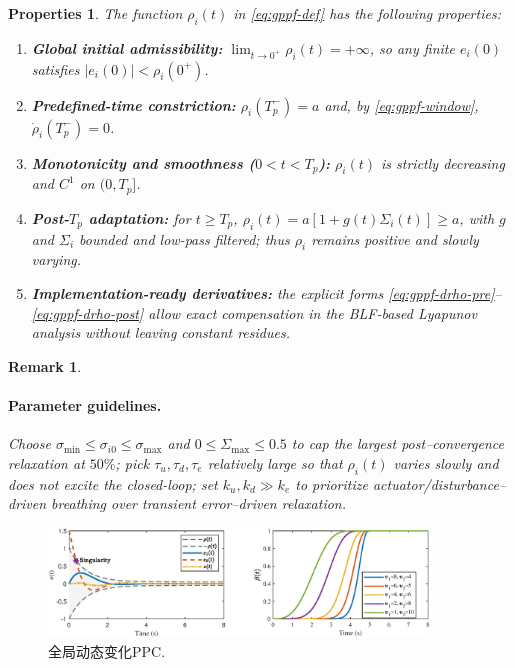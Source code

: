 \documentclass[pdflatex,sn-mathphys-num]{sn-jnl}%
\theoremstyle{thmstyleone}%
\theoremstyle{thmstyletwo}%
\newtheorem{remark}{Remark}%
\newtheorem{properties}{Properties}%
\theoremstyle{thmstylethree}%
\begin{document}
\begin{properties}
The function $\rho_i(t)$ in \eqref{eq:gppf-def} has the following properties:
\begin{enumerate}
\item \textbf{Global initial admissibility:} $\displaystyle\lim_{t\to0^+}\rho_i(t)=+\infty$, so any finite $e_i(0)$ satisfies $|e_i(0)|<\rho_i(0^+)$.
\item \textbf{Predefined-time constriction:} $\rho_i(T_p^-)=a$ and, by \eqref{eq:gppf-window}, $\dot\rho_i(T_p^-)=0$.
\item \textbf{Monotonicity and smoothness ($0<t<T_p$):} $\rho_i(t)$ is strictly decreasing and $C^1$ on $(0,T_p]$.
\item \textbf{Post-$T_p$ adaptation:} for $t\ge T_p$, $\rho_i(t)=a[1+g(t)\Sigma_i(t)]\ge a$, with $g$ and $\Sigma_i$ bounded and low-pass filtered; thus $\rho_i$ remains positive and slowly varying.
\item \textbf{Implementation-ready derivatives:} the explicit forms \eqref{eq:gppf-drho-pre}–\eqref{eq:gppf-drho-post} allow exact compensation in the BLF-based Lyapunov analysis without leaving constant residues.
\end{enumerate}
\end{properties}

\begin{remark}
\paragraph{Parameter guidelines.}
Choose $\sigma_{\min}\le\sigma_{i0}\le\sigma_{\max}$ and $0\le\Sigma_{\max}\le 0.5$ to cap the largest post–convergence relaxation at $50\%$; pick $\tau_u,\tau_d,\tau_e$ relatively large so that $\rho_i(t)$ varies slowly and does not excite the closed-loop; set $k_u,k_d\gg k_e$ to prioritize actuator/disturbance–driven breathing over transient error–driven relaxation.%
\end{remark}
	
\begin{figure}[H]
	\centering
	\includegraphics[width=0.9\textwidth]{fig1.eps}
	\caption{全局动态变化PPC.}
	\label{fig:1}
\end{figure}
\end{document}
